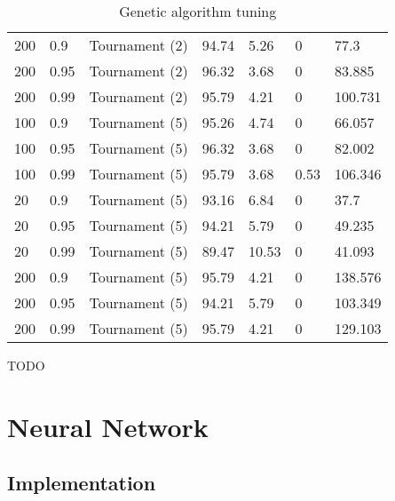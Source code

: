 \documentclass[a4paper]{article}
\begin{document}
\begin{table}[h!]
\begin{tabular}{@{}lllllll@{}}
    200             & 0.9             & Tournament (2) & 94.74         & 5.26       & 0                 & 77.3     \\
    200             & 0.95            & Tournament (2) & 96.32         & 3.68       & 0                 & 83.885   \\
    200             & 0.99            & Tournament (2) & 95.79         & 4.21       & 0                 & 100.731  \\
    100             & 0.9             & Tournament (5) & 95.26         & 4.74       & 0                 & 66.057   \\
    100             & 0.95            & Tournament (5) & 96.32         & 3.68       & 0                 & 82.002   \\
    100             & 0.99            & Tournament (5) & 95.79         & 3.68       & 0.53              & 106.346  \\
    20              & 0.9             & Tournament (5) & 93.16         & 6.84       & 0                 & 37.7     \\
    20              & 0.95            & Tournament (5) & 94.21         & 5.79       & 0                 & 49.235   \\
    20              & 0.99            & Tournament (5) & 89.47         & 10.53      & 0                 & 41.093   \\
    200             & 0.9             & Tournament (5) & 95.79         & 4.21       & 0                 & 138.576  \\
    200             & 0.95            & Tournament (5) & 94.21         & 5.79       & 0                 & 103.349  \\
    200             & 0.99            & Tournament (5) & 95.79         & 4.21       & 0                 & 129.103  \\
    \bottomrule
  \end{tabular}
  \caption{Genetic algorithm tuning}
  \label{tab:ga_tuning}
\end{table}

TODO

\section{Neural Network}
\label{sec:nn}

\subsection{Implementation}
\label{sec:nn_implementation}
\end{document}
